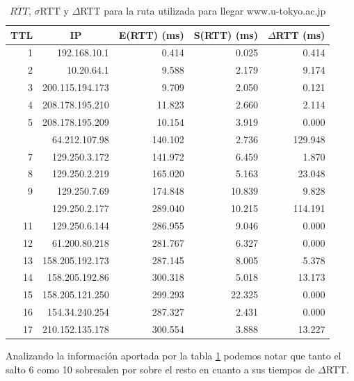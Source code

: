 \begin{table}[H]
    \begin{center}
        \begin{tabular}{| r | r | r | r | r |}
  \hline
  {\bf TTL} & \multicolumn{1}{|c|}{\bf IP} & {\bf E(RTT) (ms)} & {\bf S(RTT) (ms)} & {\bf $\Delta$RTT (ms)}\\
  \hline
\hline 1  & 192.168.10.1 & 0.414 & 0.025 & 0.414\\
\hline 2  & 10.20.64.1 & 9.588 & 2.179 & 9.174\\
\hline 3  & 200.115.194.173 & 9.709 & 2.050 & 0.121\\
\hline 4  & 208.178.195.210 & 11.823 & 2.660 & 2.114\\
\hline 5  & 208.178.195.209 & 10.154 & 3.919 & 0.000\\
\rowcolor{blue!25}\hline 6  & 64.212.107.98 & 140.102 & 2.736 & 129.948\\
\hline 7  & 129.250.3.172 & 141.972 & 6.459 & 1.870\\
\hline 8  & 129.250.2.219 & 165.020 & 5.163 & 23.048\\
\hline 9  & 129.250.7.69 & 174.848 & 10.839 & 9.828\\
\rowcolor{blue!25}\hline 10  & 129.250.2.177 & 289.040 & 10.215 & 114.191\\
\hline 11  & 129.250.6.144 & 286.955 & 9.046 & 0.000\\
\hline 12  & 61.200.80.218 & 281.767 & 6.327 & 0.000\\
\hline 13  & 158.205.192.173 & 287.145 & 8.005 & 5.378\\
\hline 14  & 158.205.192.86 & 300.318 & 5.018 & 13.173\\
\hline 15  & 158.205.121.250 & 299.293 & 22.325 & 0.000\\
\hline 16  & 154.34.240.254 & 287.327 & 2.431 & 0.000\\
\hline 17  & 210.152.135.178 & 300.554 & 3.888 & 13.227\\
\hline
        \end{tabular}
        \caption{$\overline{RTT}$, $\sigma$RTT y $\Delta$RTT para la ruta utilizada para llegar www.u-tokyo.ac.jp}
        \label{table:tokyo} 
    \end{center}
\end{table}

Analizando la información aportada por la tabla \ref{table:tokyo} podemos notar que tanto el salto 6 como 10 sobresalen por sobre el resto en cuanto a sus tiempos de $\Delta$RTT. 

